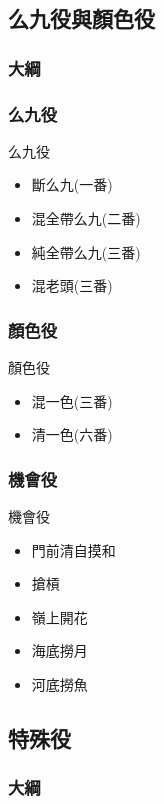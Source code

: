 \documentclass[utf8]{beamer}
\begin{document}
\begin{CJK}{UTF8}{bkai}
\subsection{么九役與顏色役}
\begin{frame}
  \frametitle{大綱}
  \begin{multicols}{2}
  \end{multicols}
\end{frame}

\begin{frame}
  \frametitle{么九役}
  \begin{block}{么九役}
    \begin{itemize}
    \item 斷么九(一番)
    \item 混全帶么九(二番)
    \item 純全帶么九(三番)
    \item 混老頭(三番)
    \end{itemize}
  \end{block}
\end{frame}

\begin{frame}
  \frametitle{顏色役}
  \begin{block}{顏色役}
    \begin{itemize}
    \item 混一色(三番)
    \item 清一色(六番)
    \end{itemize}
  \end{block}
\end{frame}

\begin{frame}
  \frametitle{機會役}
  \begin{block}{機會役}
    \begin{itemize}
    \item 門前清自摸和
    \item 搶槓
    \item 嶺上開花
    \item 海底撈月
    \item 河底撈魚
    \end{itemize}
  \end{block}
\end{frame}

\subsection{特殊役}
\begin{frame}
  \frametitle{大綱}
  \begin{multicols}{2}
  \end{multicols}
\end{frame}


\end{CJK}
\end{document}
